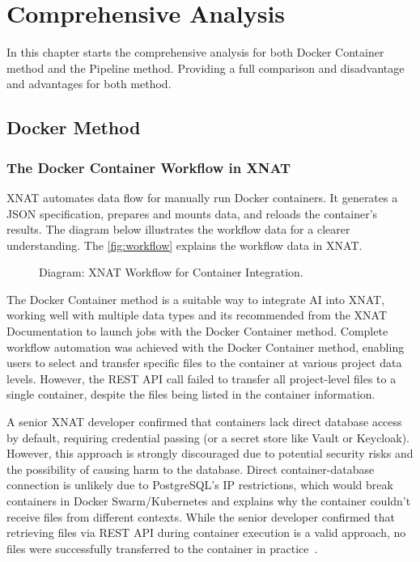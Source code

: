 \chapter{Comprehensive Analysis}
In this chapter starts the comprehensive analysis for both Docker Container method and the Pipeline method. 
Providing a full comparison and disadvantage and advantages for both method.
\section{Docker Method}
\subsection{The Docker Container Workflow in XNAT}

XNAT automates data flow for manually run Docker containers. It generates a JSON specification, prepares and mounts data, and reloads the container's results.
The diagram below illustrates the workflow data for a clearer understanding.  
The \autoref{fig:workflow} explains the workflow data in XNAT.

\begin{figure}[H]
    \centering
    \def\svgwidth{\linewidth} 
    
    \caption{Diagram: XNAT Workflow for Container Integration.}
    \label{fig:workflow}
\end{figure}


The Docker Container method is a suitable way to integrate AI into XNAT, working well with multiple data types and its recommended from the XNAT Documentation to launch jobs with the Docker Container method. Complete workflow automation was achieved with the Docker Container method, enabling users to select and transfer specific files to the container at various project data levels. However, the REST API call failed to transfer all project-level files to a single container, despite the files being listed in the container information.  

A senior XNAT developer confirmed that containers lack direct database access by default, requiring credential passing (or a secret store like Vault or Keycloak). However, this approach is strongly discouraged due to potential security risks and the possibility of causing harm to the database. Direct container-database connection is unlikely due to PostgreSQL's IP restrictions, which would break containers in Docker Swarm/Kubernetes and explains why the container couldn't receive files from different contexts.
While the senior developer confirmed that retrieving files via REST API during container execution is a valid approach, no files were successfully transferred to the container in practice~\cite{database}.




